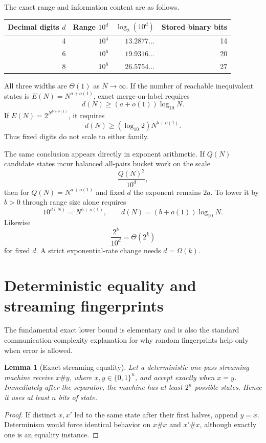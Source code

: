 \documentclass[11pt]{article}
\newtheorem{lemma}[theorem]{Lemma}
\begin{document}
The exact range and information content are as follows.

\begin{center}
\begin{tabular}{@{}rrrr@{}}
\toprule
Decimal digits $d$ & Range $10^d$ & $\log_2(10^d)$ & Stored binary bits \\
\midrule
4 & $10^4$ & $13.2877\ldots$ & 14 \\
6 & $10^6$ & $19.9316\ldots$ & 20 \\
8 & $10^8$ & $26.5754\ldots$ & 27 \\
\bottomrule
\end{tabular}
\end{center}

All three widths are $\Theta(1)$ as $N\to\infty$.  If the number of
reachable inequivalent states is $E(N)=N^{a+o(1)}$, exact merge-on-label
requires
\[
 d(N)\ge (a+o(1))\log_{10}N.
 \tag{2}
\]
If $E(N)=2^{N^{b+o(1)}}$, it requires
\[
 d(N)\ge (\log_{10}2)N^{b+o(1)}.
 \tag{3}
\]
Thus fixed digits do not scale to either family.

The same conclusion appears directly in exponent arithmetic.  If $Q(N)$
candidate states incur balanced all-pairs bucket work on the scale
\[
 \frac{Q(N)^2}{10^d},
\]
then for $Q(N)=N^{a+o(1)}$ and fixed $d$ the exponent remains $2a$.
To lower it by $b>0$ through range size alone requires
\[
 10^{d(N)}=N^{b+o(1)},
 \qquad d(N)=(b+o(1))\log_{10}N.
 \tag{4}
\]
Likewise
\[
 \frac{2^k}{10^d}=\Theta(2^k)
\]
for fixed $d$.  A strict exponential-rate change needs $d=\Omega(k)$.

\section{Deterministic equality and streaming fingerprints}

The fundamental exact lower bound is elementary and is also the standard
communication-complexity explanation for why random fingerprints help only
when error is allowed.

\begin{lemma}[Exact streaming equality]\label{lem:eq-stream}
Let a deterministic one-pass streaming machine receive $x\#y$, where
$x,y\in\{0,1\}^n$, and accept exactly when $x=y$.  Immediately after the
separator, the machine has at least $2^n$ possible states.  Hence it uses at
least $n$ bits of state.
\end{lemma}

\begin{proof}
If distinct $x,x'$ led to the same state after their first halves, append
$y=x$.  Determinism would force identical behavior on $x\#x$ and
$x'\#x$, although exactly one is an equality instance.
\end{proof}
\end{document}
